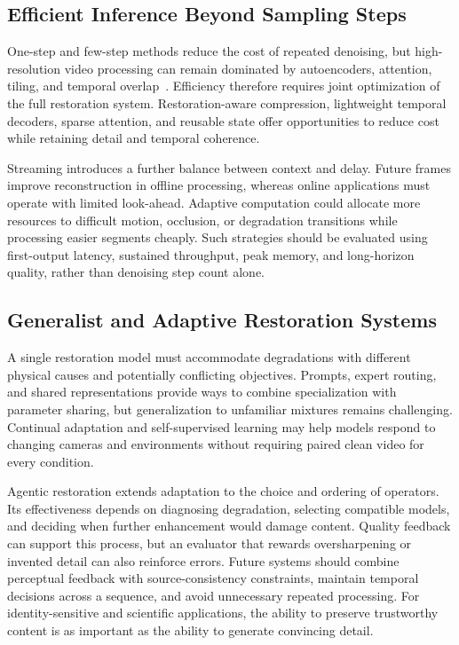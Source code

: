 \subsection{Efficient Inference Beyond Sampling Steps}
One-step and few-step methods reduce the cost of repeated denoising, but high-resolution video processing can remain dominated by autoencoders, attention, tiling, and temporal overlap~\cite{dove,seedvr2,flash}. Efficiency therefore requires joint optimization of the full restoration system. Restoration-aware compression, lightweight temporal decoders, sparse attention, and reusable state offer opportunities to reduce cost while retaining detail and temporal coherence.

Streaming introduces a further balance between context and delay. Future frames improve reconstruction in offline processing, whereas online applications must operate with limited look-ahead. Adaptive computation could allocate more resources to difficult motion, occlusion, or degradation transitions while processing easier segments cheaply. Such strategies should be evaluated using first-output latency, sustained throughput, peak memory, and long-horizon quality, rather than denoising step count alone.

\subsection{Generalist and Adaptive Restoration Systems}
A single restoration model must accommodate degradations with different physical causes and potentially conflicting objectives. Prompts, expert routing, and shared representations provide ways to combine specialization with parameter sharing, but generalization to unfamiliar mixtures remains challenging. Continual adaptation and self-supervised learning may help models respond to changing cameras and environments without requiring paired clean video for every condition.

Agentic restoration extends adaptation to the choice and ordering of operators. Its effectiveness depends on diagnosing degradation, selecting compatible models, and deciding when further enhancement would damage content. Quality feedback can support this process, but an evaluator that rewards oversharpening or invented detail can also reinforce errors. Future systems should combine perceptual feedback with source-consistency constraints, maintain temporal decisions across a sequence, and avoid unnecessary repeated processing. For identity-sensitive and scientific applications, the ability to preserve trustworthy content is as important as the ability to generate convincing detail.

